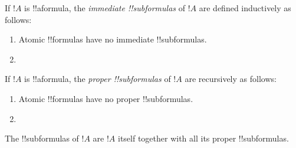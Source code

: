 \documentclass[../../../include/open-logic-section]{subfiles}
\begin{document}
\begin{defn}
If $!A$ is !!a{formula}, the \emph{immediate !!{subformula}s}
of $!A$ are defined inductively as follows:
\begin{enumerate}
\item Atomic !!{formula}s have no immediate !!{subformula}s.


\item {}

\end{enumerate}
\end{defn}

\begin{defn}
If $!A$ is !!a{formula}, the \emph{proper !!{subformula}s}
of $!A$ are recursively as follows:
\begin{enumerate}
\item Atomic !!{formula}s have no proper !!{subformula}s.


\item {}
\end{enumerate}
\end{defn}

\begin{defn}[!!^{subformula}]
The !!{subformula}s of $!A$ are $!A$ itself together with all its
proper !!{subformula}s.
\end{defn}
\end{document}
